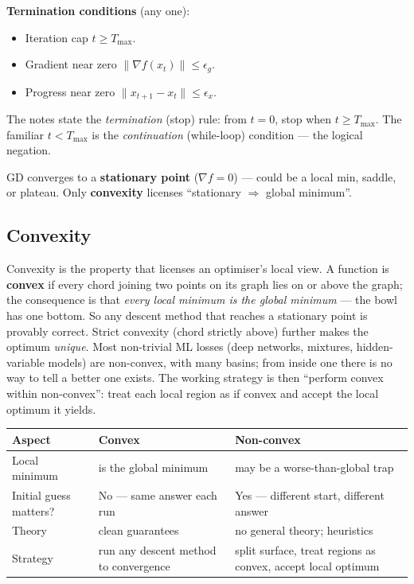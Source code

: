 \documentclass[11pt, a4paper]{article}
\newcommand{\thead}[1]{\textbf{#1}}
\newcommand{\kw}[1]{\textbf{#1}}
\begin{document}
\kw{Termination conditions} (any one):
\begin{itemize}
  \item Iteration cap $t\ge T_{\max}$.
  \item Gradient near zero $\|\nabla f(x_t)\|\le\epsilon_g$.
  \item Progress near zero $\|x_{t+1}-x_t\|\le\epsilon_x$.
\end{itemize}

\begin{pitfallbox}
The notes state the \emph{termination} (stop) rule: from $t{=}0$, stop when $t\ge T_{\max}$. The
familiar $t<T_{\max}$ is the \emph{continuation} (while-loop) condition — the logical negation.
\end{pitfallbox}

\begin{pitfallbox}
GD converges to a \kw{stationary point} ($\nabla f=0$) — could be a local min, saddle, or plateau.
Only \kw{convexity} licenses ``stationary $\Rightarrow$ global minimum''.
\end{pitfallbox}

\subsection{Convexity}

Convexity is the property that licenses an optimiser's local view. A function is \kw{convex} if every
chord joining two points on its graph lies on or above the graph; the consequence is that
\emph{every local minimum is the global minimum} — the bowl has one bottom. So any descent method
that reaches a stationary point is provably correct. Strict convexity (chord strictly above) further
makes the optimum \emph{unique}. Most non-trivial ML losses (deep networks, mixtures, hidden-variable
models) are non-convex, with many basins; from inside one there is no way to tell a better one
exists. The working strategy is then ``perform convex within non-convex'': treat each local region
as if convex and accept the local optimum it yields.

\begin{center}
\renewcommand{\arraystretch}{1.25}
\begin{tabularx}{\linewidth}{l X X}
\toprule
\thead{Aspect} & \thead{Convex} & \thead{Non-convex} \\
\midrule
Local minimum & is the global minimum & may be a worse-than-global trap \\
Initial guess matters? & No — same answer each run & Yes — different start, different answer \\
Theory & clean guarantees & no general theory; heuristics \\
Strategy & run any descent method to convergence & split surface, treat regions as convex, accept local optimum \\
\bottomrule
\end{tabularx}
\end{center}
\end{document}
